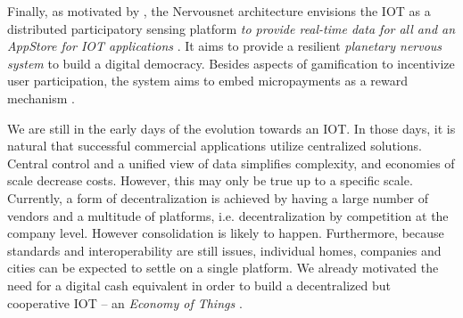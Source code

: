 Finally, as motivated by \cite{Giannotti2012}, the Nervousnet architecture envisions the \ac{IOT} as a distributed participatory sensing platform \emph{to provide real-time data for all and an AppStore for \ac{IOT} applications} \parencite{7097988}. It aims to provide a resilient \emph{planetary nervous system} to build a digital democracy. Besides aspects of gamification to incentivize user participation, the system aims to embed micropayments as a reward mechanism \parencite{Helbing2015Nature}.

We are still in the early days of the evolution towards an \ac{IOT}. In those days, it is natural that successful commercial applications utilize centralized solutions. Central control and a unified view of data simplifies complexity, and economies of scale decrease costs. However, this may only be true up to a specific scale. Currently, a form of decentralization is achieved by having a large number of vendors and a multitude of platforms, i.e. decentralization by competition at the company level. However consolidation is likely to happen. Furthermore, because standards and interoperability are still issues, individual homes, companies and cities can be expected to settle on a single platform.
We already motivated the need for a digital cash equivalent in order to build a decentralized but cooperative \ac{IOT} -- an \emph{Economy of Things} \parencite{Pureswaran2015}.








